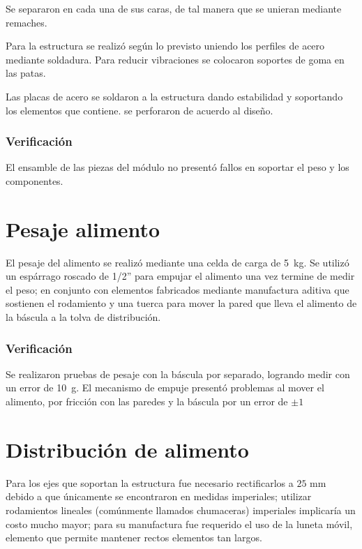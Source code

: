 Se separaron en cada una de sus caras, de tal manera que se unieran mediante remaches. 

Para la estructura se realizó según lo previsto uniendo los perfiles de acero mediante soldadura. Para reducir vibraciones se colocaron soportes de goma en las patas.

Las placas de acero se soldaron a la estructura dando estabilidad y soportando los elementos que contiene. se perforaron de acuerdo al diseño.



\subsubsection{Verificación}

El ensamble de las piezas del módulo no presentó fallos en soportar el peso y los componentes.


\section{Pesaje alimento}

El pesaje del alimento se realizó mediante una celda de carga de \SI{5}{kg}. Se utilizó un espárrago roscado de 1/2'' para empujar el alimento una vez termine de medir el peso; en conjunto con elementos fabricados mediante manufactura aditiva que sostienen el rodamiento y una tuerca para mover la pared que lleva el alimento de la báscula a la tolva de distribución.

\subsubsection{Verificación}

Se realizaron pruebas de pesaje con la báscula por separado, logrando medir con un error de \SI{10}{g}. El mecanismo de empuje presentó problemas al mover el alimento, por fricción con las paredes y la báscula por un error de $\pm 1$

\section{Distribución de alimento}

Para los ejes que soportan la estructura fue necesario rectificarlos a $25 \text{ mm}$ debido a que únicamente se encontraron en medidas imperiales; utilizar rodamientos lineales (comúnmente llamados chumaceras) imperiales implicaría un costo mucho mayor; para su manufactura fue requerido el uso de la luneta móvil, elemento que permite mantener rectos elementos tan largos.

